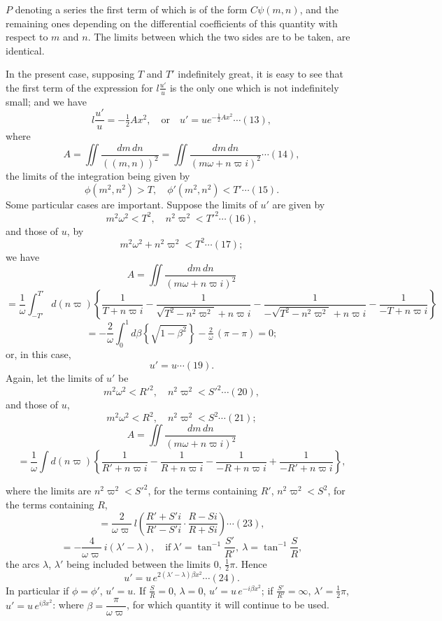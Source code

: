 \documentclass[12pt,a4paper]{article}
\newcommand{\mn}{(m,n)}
\begin{document}
\newpage
\setcounter{page}{139}

$P$ denoting a series the first term of which is of the form $C\psi(m, n)$, and the remaining ones depending on the differential coefficients of this quantity with respect to $m$ and $n$. The limits between which the two sides are to be taken, are identical.

In the present case, supposing $T$ and $T'$ indefinitely great, it is easy to see that the first term of the expression for $l\frac{u'}{u}$ is the only one which is not indefinitely small; and we have
\[
l\frac{u'}{u} = -\tfrac{1}{2}Ax^2,\quad \text{or}\quad u' = u e^{-\frac{1}{2}Ax^2} \cdots(13),
\]
where
\[
A = \iint\frac{dm\,dn}{(\mn)^2} = \iint\frac{dm\,dn}{(m\omega + n\varpi i)^2} \cdots(14),
\]
the limits of the integration being given by
\[
\phi(m^2, n^2) > T,\quad \phi'(m^2, n^2) < T' \cdots(15).
\]
Some particular cases are important. Suppose the limits of $u'$ are given by
\[
m^2\omega^2 < T^2,\quad n^2\varpi^2 < T'^2 \cdots(16),
\]
and those of $u$, by
\[
m^2\omega^2 + n^2\varpi^2 < T^2 \cdots(17);
\]
we have
\[
A = \iint\frac{dm\,dn}{(m\omega + n\varpi i)^2}
\]
\[
= \frac{1}{\omega}\int_{-T'}^{T'}\!d(n\varpi)\!\left\{\frac{1}{T + n\varpi i} - \frac{1}{\sqrt{T^2 - n^2\varpi^2}+n\varpi i} - \frac{1}{-\sqrt{T^2 - n^2\varpi^2}+n\varpi i} - \frac{1}{-T+n\varpi i}\right\}
\]
\[
= -\frac{2}{\omega}\int_0^1 d\beta\!\left\{\sqrt{1-\beta^2}\right\} - \tfrac{2}{\omega}\,(\pi - \pi) = 0;
\]
or, in this case,
\[
u' = u \cdots(19).
\]
Again, let the limits of $u'$ be
\[
m^2\omega^2 < R'^2,\quad n^2\varpi^2 < S'^2 \cdots(20),
\]
and those of $u$,
\[
m^2\omega^2 < R^2,\quad n^2\varpi^2 < S^2 \cdots(21);
\]
\[
A = \iint\frac{dm\,dn}{(m\omega + n\varpi i)^2}
\]
\[
= \frac{1}{\omega}\int d(n\varpi)\!\left\{\frac{1}{R' + n\varpi i} - \frac{1}{R + n\varpi i} - \frac{1}{-R + n\varpi i} + \frac{1}{-R' + n\varpi i}\right\},
\]

\newpage
\setcounter{page}{140}

where the limits are $n^2\varpi^2 < S'^2$, for the terms containing $R'$, $n^2\varpi^2 < S^2$, for the terms containing $R$,
\[
= \frac{2}{\omega\varpi}\,l\!\left(\frac{R' + S'i}{R' - S'i}\cdot\frac{R - Si}{R + Si}\right) \cdots(23),
\]
\[
= -\frac{4}{\omega\varpi}\,i(\lambda' - \lambda),\quad \text{if}\ \lambda' = \tan^{-1}\frac{S'}{R'},\ \lambda = \tan^{-1}\frac{S}{R},
\]
the arcs $\lambda$, $\lambda'$ being included between the limits $0$, $\tfrac{1}{2}\pi$. Hence
\[
u' = u\,e^{2(\lambda' - \lambda)\beta x^2} \cdots(24).
\]
In particular if $\phi = \phi'$, $u' = u$. If $\frac{S}{R} = 0$, $\lambda = 0$, $u' = u\,e^{-i\beta x^2}$; if $\frac{S'}{R'} = \infty$, $\lambda' = \tfrac{1}{2}\pi$, $u' = u\,e^{i\beta x^2}$: where $\beta = \dfrac{\pi}{\omega\varpi}$, for which quantity it will continue to be used.
\end{document}
